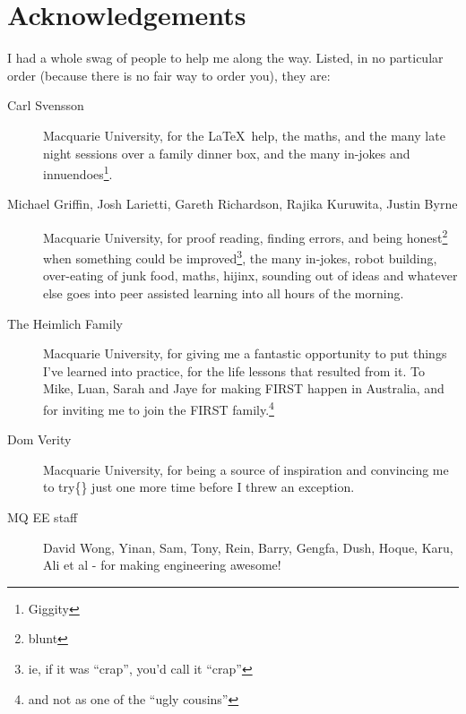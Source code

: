 \chapter{Acknowledgements}
\label{chap:Acknowledgements}
I had a whole swag of people to help me along the way. Listed, in no particular
order (because there is no fair way to order you), they are:
\begin{description}
  \item[Carl Svensson] Macquarie University, for the \LaTeX~help, the maths, and
  the many late night sessions over a family dinner box, and the many in-jokes
  and innuendoes\footnote{Giggity}.
  
  \item[Michael Griffin, Josh Larietti, Gareth Richardson, Rajika Kuruwita,
  Justin Byrne] Macquarie University, for proof reading, finding errors, and
  being honest\footnote{blunt} when something could be improved\footnote{ie,
  if it was ``crap'', you'd call it ``crap''}, the many in-jokes, robot
  building, over-eating of junk food, maths, hijinx, sounding out of ideas and
  whatever else goes into peer assisted learning into all hours of the morning.
  
  \item[The Heimlich Family] Macquarie University, for giving me a fantastic
  opportunity to put things I've learned into practice, for the life lessons
  that resulted from it. To Mike, Luan, Sarah and Jaye for making FIRST happen
  in Australia, and for inviting me to join the FIRST family.\footnote{and not
  as one of the ``ugly cousins''}
  
  \item[Dom Verity] Macquarie University, for being a source of inspiration and
  convincing me to try\{\} just one more time before I threw an exception.
  
  \item[MQ EE staff] David Wong, Yinan,
  Sam, Tony, Rein, Barry, Gengfa, Dush, Hoque, Karu, Ali et al - for making
  engineering awesome!
  
  

\end{description}
